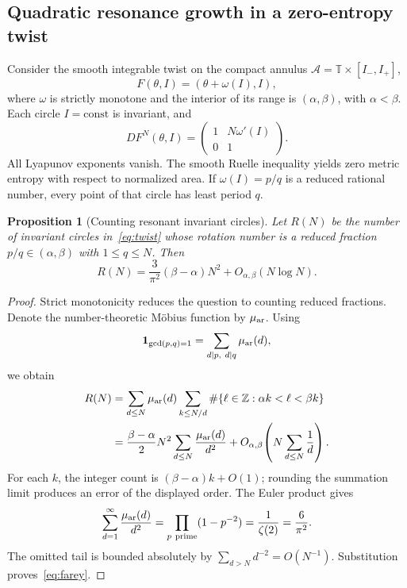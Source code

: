 \documentclass[review,12pt,times,a4paper,nopreprintline]{elsarticle}
\theoremstyle{plain}
\newtheorem{proposition}[theorem]{Proposition}
\theoremstyle{definition}
\theoremstyle{remark}
\newcommand{\T}{\mathbb T}
\newcommand{\Z}{\mathbb Z}
\numberwithin{equation}{section}
\begin{document}
\subsection{Quadratic resonance growth in a zero-entropy twist}
Consider the smooth integrable twist on the compact annulus $\mathcal A=\T\times[I_-,I_+]$,
\begin{equation}\label{eq:twist}
 F(\theta,I)=(\theta+\omega(I),I),
\end{equation}
where $\omega$ is strictly monotone and the interior of its range is $(\alpha,\beta)$, with $\alpha<\beta$. Each circle $I=\mathrm{const}$ is invariant, and
\[
 DF^N(\theta,I)=
 \begin{pmatrix}1&N\omega'(I)\\0&1\end{pmatrix}.
\]
All Lyapunov exponents vanish. The smooth Ruelle inequality yields zero metric entropy with respect to normalized area. If $\omega(I)=p/q$ is a reduced rational number, every point of that circle has least period $q$.

\begin{proposition}[Counting resonant invariant circles]\label{prop:resonance}
Let $R(N)$ be the number of invariant circles in~\eqref{eq:twist} whose rotation number is a reduced fraction $p/q\in(\alpha,\beta)$ with $1\leq q\leq N$. Then
\begin{equation}\label{eq:farey}
 R(N)=\frac{3}{\pi^2}(\beta-\alpha)N^2
       +O_{\alpha,\beta}(N\log N).
\end{equation}
\end{proposition}
\begin{proof}
Strict monotonicity reduces the question to counting reduced fractions. Denote the number-theoretic M\"obius function by $\mu_{\rm ar}$. Using
\[
 \mathbf1_{\gcd(p,q)=1}=\sum_{d\mid p,\ d\mid q}\mu_{\rm ar}(d),
\]
we obtain
\begin{align*}
 R(N)
 &=\sum_{d\leq N}\mu_{\rm ar}(d)
   \sum_{k\leq N/d}\#\{\ell\in\Z:\alpha k<\ell<\beta k\}\\
 &=\frac{\beta-\alpha}{2}N^2
   \sum_{d\leq N}\frac{\mu_{\rm ar}(d)}{d^2}
   +O_{\alpha,\beta}\!\left(N\sum_{d\leq N}\frac1d\right).
\end{align*}
For each $k$, the integer count is $(\beta-\alpha)k+O(1)$; rounding the summation limit produces an error of the displayed order. The Euler product gives
\[
 \sum_{d=1}^{\infty}\frac{\mu_{\rm ar}(d)}{d^2}
 =\prod_{p\ {\rm prime}}(1-p^{-2})
 =\frac1{\zeta(2)}=\frac6{\pi^2}.
\]
The omitted tail is bounded absolutely by $\sum_{d>N}d^{-2}=O(N^{-1})$. Substitution proves~\eqref{eq:farey}.
\end{proof}
\end{document}
